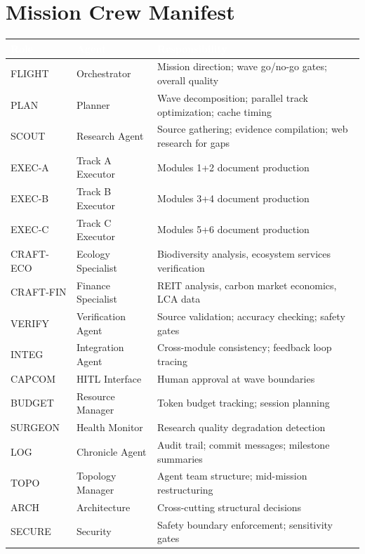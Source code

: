 \documentclass[11pt,letterpaper]{article}
\newcommand{\tableheader}[1]{\textbf{\sffamily\textcolor{white}{#1}}}
\begin{document}
\section{Mission Crew Manifest}

\begin{center}
\begin{tabularx}{\textwidth}{L{2cm}L{3cm}X}
\toprule
{}
\tableheader{Role} & \tableheader{Agent} & \tableheader{Responsibility} \\
\midrule
FLIGHT & Orchestrator & Mission direction; wave go/no-go gates; overall quality \\
PLAN & Planner & Wave decomposition; parallel track optimization; cache timing \\
SCOUT & Research Agent & Source gathering; evidence compilation; web research for gaps \\
EXEC-A & Track A Executor & Modules 1+2 document production \\
EXEC-B & Track B Executor & Modules 3+4 document production \\
EXEC-C & Track C Executor & Modules 5+6 document production \\
CRAFT-ECO & Ecology Specialist & Biodiversity analysis, ecosystem services verification \\
CRAFT-FIN & Finance Specialist & REIT analysis, carbon market economics, LCA data \\
VERIFY & Verification Agent & Source validation; accuracy checking; safety gates \\
INTEG & Integration Agent & Cross-module consistency; feedback loop tracing \\
CAPCOM & HITL Interface & Human approval at wave boundaries \\
BUDGET & Resource Manager & Token budget tracking; session planning \\
SURGEON & Health Monitor & Research quality degradation detection \\
LOG & Chronicle Agent & Audit trail; commit messages; milestone summaries \\
TOPO & Topology Manager & Agent team structure; mid-mission restructuring \\
ARCH & Architecture & Cross-cutting structural decisions \\
SECURE & Security & Safety boundary enforcement; sensitivity gates \\
\bottomrule
\end{tabularx}
\end{center}
\end{document}
